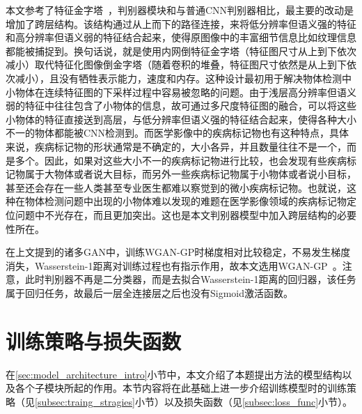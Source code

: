 本文参考了特征金字塔~\cite{lin2017feature}，判别器模块和与普通CNN判别器相比，最主要的改动是增加了跨层结构。该结构通过从上而下的路径连接，来将低分辨率但语义强的特征和高分辨率但语义弱的特征结合起来，使得原图像中的丰富细节信息比如纹理信息都能被捕捉到。换句话说，就是使用内网倒特征金字塔（特征图尺寸从上到下依次减小）取代特征化图像倒金字塔（随着卷积的堆叠，特征图尺寸依然是从上到下依次减小），且没有牺牲表示能力，速度和内存。这种设计最初用于解决物体检测中小物体在连续特征图的下采样过程中容易被忽略的问题。由于浅层高分辨率但语义弱的特征中往往包含了小物体的信息，故可通过多尺度特征图的融合，可以将这些小物体的特征直接送到高层，与低分辨率但语义强的特征结合起来，使得各种大小不一的物体都能被CNN检测到。而医学影像中的疾病标记物也有这种特点，具体来说，疾病标记物的形状通常是不确定的，大小各异，并且数量往往不是一个，而是多个。因此，如果对这些大小不一的疾病标记物进行比较，也会发现有些疾病标记物属于大物体或者说大目标，而另外一些疾病标记物属于小物体或者说小目标，甚至还会存在一些人类甚至专业医生都难以察觉到的微小疾病标记物。也就说，这种在物体检测问题中出现的小物体难以发现的难题在医学影像领域的疾病标记物定位问题中不光存在，而且更加突出。这也是本文判别器模型中加入跨层结构的必要性所在。

在上文提到的诸多GAN中，训练WGAN-GP时梯度相对比较稳定，不易发生梯度消失，Wasserstein-1距离对训练过程也有指示作用，故本文选用WGAN-GP~\cite{gulrajani2017improved}。注意，此时判别器不再是二分类器，而是去拟合Wasserstein-1距离的回归器，该任务属于回归任务，故最后一层全连接层之后也没有Sigmoid激活函数。

\section{训练策略与损失函数}\label{sec:loss_func_training_stragies}
在\ref{sec:model_architecture_intro}小节中，本文介绍了本题提出方法的模型结构以及各个子模块所起的作用。本节内容将在此基础上进一步介绍训练模型时的训练策略（见\ref{subsec:traing_stragies}小节）以及损失函数（见\ref{subsec:loss_func}小节）。

